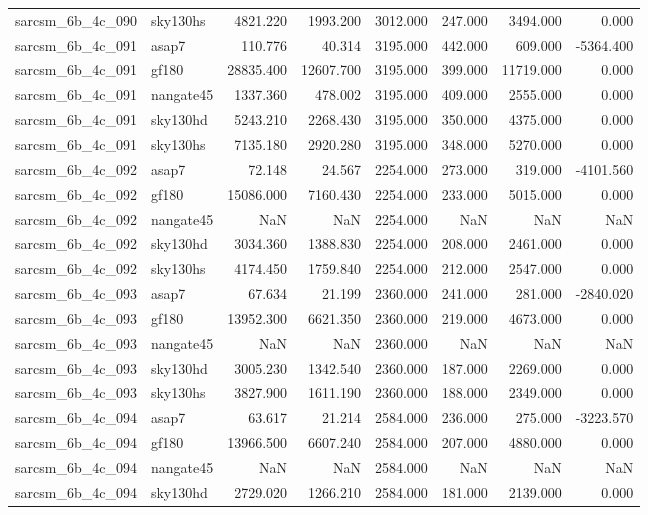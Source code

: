 \begin{tabular}{llrrrrrr}
sarcsm\_6b\_4c\_090 & sky130hs & 4821.220 & 1993.200 & 3012.000 & 247.000 & 3494.000 & 0.000 \\
sarcsm\_6b\_4c\_091 & asap7 & 110.776 & 40.314 & 3195.000 & 442.000 & 609.000 & -5364.400 \\
sarcsm\_6b\_4c\_091 & gf180 & 28835.400 & 12607.700 & 3195.000 & 399.000 & 11719.000 & 0.000 \\
sarcsm\_6b\_4c\_091 & nangate45 & 1337.360 & 478.002 & 3195.000 & 409.000 & 2555.000 & 0.000 \\
sarcsm\_6b\_4c\_091 & sky130hd & 5243.210 & 2268.430 & 3195.000 & 350.000 & 4375.000 & 0.000 \\
sarcsm\_6b\_4c\_091 & sky130hs & 7135.180 & 2920.280 & 3195.000 & 348.000 & 5270.000 & 0.000 \\
sarcsm\_6b\_4c\_092 & asap7 & 72.148 & 24.567 & 2254.000 & 273.000 & 319.000 & -4101.560 \\
sarcsm\_6b\_4c\_092 & gf180 & 15086.000 & 7160.430 & 2254.000 & 233.000 & 5015.000 & 0.000 \\
sarcsm\_6b\_4c\_092 & nangate45 & NaN & NaN & 2254.000 & NaN & NaN & NaN \\
sarcsm\_6b\_4c\_092 & sky130hd & 3034.360 & 1388.830 & 2254.000 & 208.000 & 2461.000 & 0.000 \\
sarcsm\_6b\_4c\_092 & sky130hs & 4174.450 & 1759.840 & 2254.000 & 212.000 & 2547.000 & 0.000 \\
sarcsm\_6b\_4c\_093 & asap7 & 67.634 & 21.199 & 2360.000 & 241.000 & 281.000 & -2840.020 \\
sarcsm\_6b\_4c\_093 & gf180 & 13952.300 & 6621.350 & 2360.000 & 219.000 & 4673.000 & 0.000 \\
sarcsm\_6b\_4c\_093 & nangate45 & NaN & NaN & 2360.000 & NaN & NaN & NaN \\
sarcsm\_6b\_4c\_093 & sky130hd & 3005.230 & 1342.540 & 2360.000 & 187.000 & 2269.000 & 0.000 \\
sarcsm\_6b\_4c\_093 & sky130hs & 3827.900 & 1611.190 & 2360.000 & 188.000 & 2349.000 & 0.000 \\
sarcsm\_6b\_4c\_094 & asap7 & 63.617 & 21.214 & 2584.000 & 236.000 & 275.000 & -3223.570 \\
sarcsm\_6b\_4c\_094 & gf180 & 13966.500 & 6607.240 & 2584.000 & 207.000 & 4880.000 & 0.000 \\
sarcsm\_6b\_4c\_094 & nangate45 & NaN & NaN & 2584.000 & NaN & NaN & NaN \\
sarcsm\_6b\_4c\_094 & sky130hd & 2729.020 & 1266.210 & 2584.000 & 181.000 & 2139.000 & 0.000 \\

\end{tabular}
